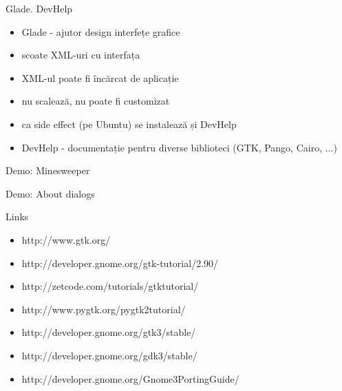 \documentclass{beamer}
\begin{document}
\begin{frame}{Glade. DevHelp}
  \begin{itemize}
    \item Glade - ajutor design interfețe grafice
    \item scoate XML-uri cu interfața
    \item XML-ul poate fi încărcat de aplicație
    \item nu scalează, nu poate fi customizat
  \pause
    \item ca side effect (pe Ubuntu) se instalează și DevHelp
    \item DevHelp - documentație pentru diverse biblioteci (GTK, Pango, Cairo, ...)
  \end{itemize}
\end{frame}

\begin{frame}{Demo: Minesweeper}
  \begin{center}
  \end{center}
\end{frame}

\begin{frame}{Demo: About dialogs}
  \begin{center}
  \end{center}
\end{frame}

\begin{frame}{Links}
  \begin{itemize}
    \item http://www.gtk.org/
    \item http://developer.gnome.org/gtk-tutorial/2.90/
    \item http://zetcode.com/tutorials/gtktutorial/
    \item http://www.pygtk.org/pygtk2tutorial/
    \item http://developer.gnome.org/gtk3/stable/
    \item http://developer.gnome.org/gdk3/stable/
    \item http://developer.gnome.org/Gnome3PortingGuide/
  \end{itemize}
\end{frame}
\end{document}

